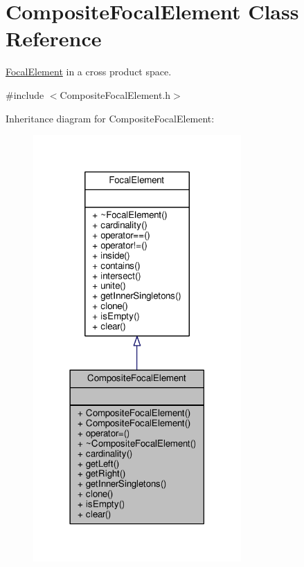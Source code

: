 \hypertarget{classCompositeFocalElement}{}\section{Composite\+Focal\+Element Class Reference}
\label{classCompositeFocalElement}


\hyperlink{classFocalElement}{Focal\+Element} in a cross product space.  




{\ttfamily \#include $<$Composite\+Focal\+Element.\+h$>$}



Inheritance diagram for Composite\+Focal\+Element\+:\nopagebreak
\begin{figure}[H]
\begin{center}
\leavevmode
\includegraphics[width=225pt]{classCompositeFocalElement__inherit__graph}
\end{center}
\end{figure}


